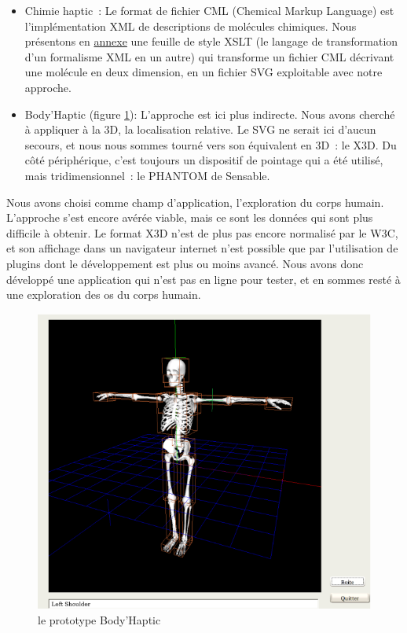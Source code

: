 \documentclass[
]{book}
\begin{document}
\begin{itemize}
\item
  Chimie haptic~: Le format de fichier CML (Chemical
  Markup Language) est l'implémentation XML de descriptions de molécules
  chimiques. Nous présentons en
  \protect\hyperlink{Laux5cux2520feuilleux5cux2520deux5cux2520styleux5cux2520XSLux5cux2520pourux5cux2520transformerux5cux2520duux5cux2520CMLux5cux2520enux5cux2520SVG}{annexe} une feuille
  de style XSLT (le langage de transformation d'un formalisme XML en un autre)
  qui transforme un fichier
  CML décrivant une molécule en deux dimension, en un fichier SVG exploitable
  avec notre approche.
\item
  Body'Haptic (figure \ref{fig:body}): L'approche est ici plus indirecte.
  Nous avons cherché
  à appliquer à la 3D, la localisation relative. Le SVG ne serait ici d'aucun
  secours, et nous nous sommes tourné vers son équivalent en 3D~: le X3D. Du
  côté périphérique, c'est toujours un dispositif de pointage qui a été
  utilisé, mais tridimensionnel~: le PHANTOM de Sensable.
\end{itemize}

Nous avons choisi comme champ d'application, l'exploration du corps
humain. L'approche s'est encore avérée viable, mais ce sont les données
qui sont plus difficile à obtenir. Le format X3D n'est de plus pas encore
normalisé par le W3C, et son affichage dans un navigateur internet n'est
possible que par l'utilisation de plugins dont le développement est plus
ou moins avancé. Nous avons donc développé une application qui n'est pas
en ligne pour tester, et en sommes resté à une exploration des os du
corps humain.

\begin{figure}
\centering
\includegraphics{img/body.png}
\caption{\label{fig:body}le prototype Body'Haptic}
\end{figure}
\end{document}

